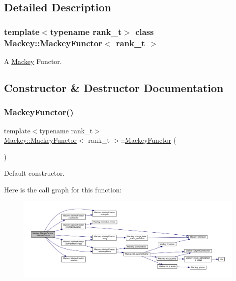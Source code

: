 \subsection{Detailed Description}
\subsubsection*{template$<$typename rank\+\_\+t$>$\newline
class Mackey\+::\+Mackey\+Functor$<$ rank\+\_\+t $>$}

A \hyperlink{namespaceMackey}{Mackey} Functor. 

\subsection{Constructor \& Destructor Documentation}
\mbox{\label{classMackey_1_1MackeyFunctor_a075cd364217700d5f5c2459d4a988a93}} 
\subsubsection{\texorpdfstring{Mackey\+Functor()}{MackeyFunctor()}\hspace{0.1cm}{\footnotesize\ttfamily [1/2]}}
{\footnotesize\ttfamily template$<$typename rank\+\_\+t$>$ \\
\hyperlink{classMackey_1_1MackeyFunctor}{Mackey\+::\+Mackey\+Functor}$<$ rank\+\_\+t $>$\+::\hyperlink{classMackey_1_1MackeyFunctor}{Mackey\+Functor} (\begin{DoxyParamCaption}{ }\end{DoxyParamCaption})\hspace{0.3cm}{\ttfamily [inline]}}



Default constructor. 

Here is the call graph for this function\+:\nopagebreak
\begin{figure}[H]
\begin{center}
\leavevmode
\includegraphics[width=350pt]{classMackey_1_1MackeyFunctor_a075cd364217700d5f5c2459d4a988a93_cgraph}
\end{center}
\end{figure}
\mbox{\label{classMackey_1_1MackeyFunctor_a7cdc1be794a7b39e7d4b86c2ad26355e}} 
